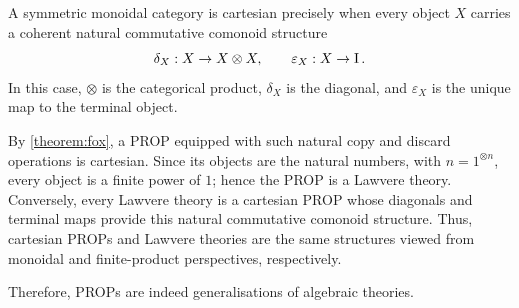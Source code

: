 \begin{theorem}
\label{theorem:fox}
A symmetric monoidal category is cartesian precisely when every object \(X\) carries a coherent natural commutative comonoid structure
\[
\delta_X : X \to X \otimes X,
\qquad
\varepsilon_X : X \to \operatorname{I}.
\]
In this case, \(\otimes\) is the categorical product, \(\delta_X\) is the diagonal, and \(\varepsilon_X\) is the unique map to the terminal object.
\end{theorem}

\begin{example}
\label{ex:cartesian-prop}
By \cref{theorem:fox}, a PROP equipped with such natural copy and discard operations is cartesian.
Since its objects are the natural numbers, with \(n = 1^{\otimes n}\), every object is a finite power of \(1\); hence the PROP is a Lawvere theory.
Conversely, every Lawvere theory is a cartesian PROP whose diagonals and terminal maps provide this natural commutative comonoid structure.
Thus, cartesian PROPs and Lawvere theories are the same structures viewed from monoidal and finite-product perspectives, respectively.
\end{example}
Therefore, PROPs are indeed generalisations of algebraic theories.


